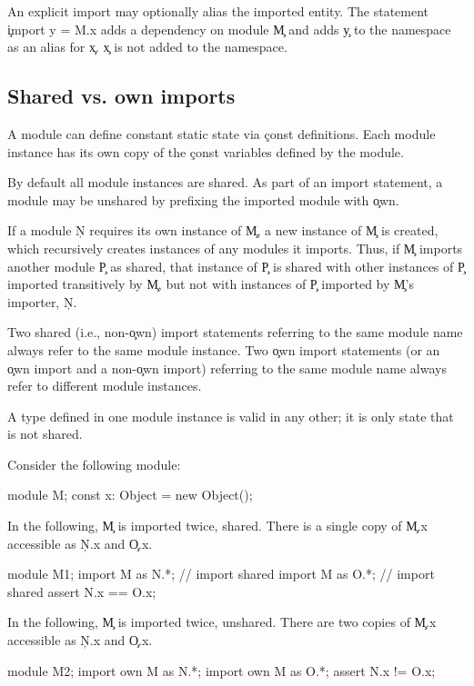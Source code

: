 \documentclass{article}
\begin{document}
An explicit import may optionally alias the imported entity.
The statement \c{import y = M.x} adds a dependency on module \c{M}
and adds \c{y} to the namespace as an alias for \c{x}.
\c{x} is not added to the namespace.

\subsection{Shared vs. own imports}

A module can define constant static state via \c{const}
definitions.  Each module instance has its own copy of the
\c{const} variables defined by the module.

By default all module instances are shared.
As part of an import statement, a module may be unshared
by prefixing the imported module with \c{own}.

If a module \c{N} requires its own instance of \c{M}, a new
instance of \c{M} is created, which recursively creates
instances of any modules it imports.  Thus, if \c{M} imports
another module \c{P} as shared, that instance of \c{P} is shared
with other instances of \c{P} imported transitively by \c{M},
but not with instances of \c{P} imported by \c{M}'s importer, \c{N}.

Two shared (i.e., non-\c{own}) import statements referring to the same module
name always refer to the same module instance. 
Two \c{own} import statements (or an \c{own} import and a
non-\c{own} import) referring to the same module
name always refer to different module instances. 

A type defined in one module instance is valid in any
other; it is only state that is not shared.

Consider the following module:
\begin{xten}
module M;
const x: Object = new Object();
\end{xten}

In the following, \c{M} is imported twice, shared.  There is a
single copy of \c{M.x} accessible as \c{N.x} and \c{O.x}.
\begin{xten}
module M1;
import M as N.*; // import shared
import M as O.*; // import shared
assert N.x == O.x;
\end{xten}

In the following, \c{M} is imported twice, unshared.  There are two
copies of \c{M.x} accessible as \c{N.x} and \c{O.x}.
\begin{xten}
module M2;
import own M as N.*;
import own M as O.*;
assert N.x != O.x;
\end{xten}
\end{document}
